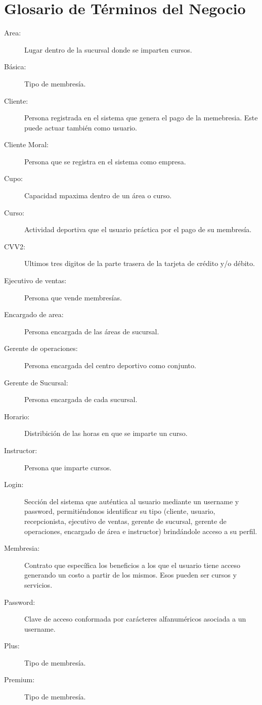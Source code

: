 \section{Glosario de Términos del Negocio}

\begin{description}
	\item[Area:] Lugar dentro de la sucursal donde se imparten cursos.
	\item[Básica:] Tipo de membresía.
	\item[Cliente:] Persona registrada en el sistema que genera el pago de la memebresia. Este puede actuar también como usuario.
	\item[Cliente Moral:] Persona que se registra en el sistema como empresa.
	\item[Cupo: ] Capacidad mpaxima dentro de un área o curso.
	\item[Curso:] Actividad deportiva que el usuario práctica por el pago de su membresía.
	\item[CVV2:] Ultimos tres digitos de la parte trasera de la tarjeta de crédito y/o débito.
	\item[Ejecutivo de ventas:] Persona que vende membresías.
	\item[Encargado de area:] Persona encargada de las áreas de sucursal.
	\item[Gerente de operaciones:] Persona encargada del centro deportivo como conjunto.
	\item[Gerente de Sucursal:] Persona encargada de cada sucursal.
	\item[Horario:] Distribición de las horas en que se imparte un curso.
	\item[Instructor:] Persona que imparte cursos.
	\item[Login:] Sección del sistema que auténtica al usuario mediante un username y password, permitiéndonos identificar su tipo (cliente, usuario, recepcionista, ejecutivo de ventas, gerente de sucursal, gerente de operaciones, encargado de área e instructor) brindándole acceso a su perfil.
	\item[Membresia:] Contrato que específica los beneficios a los que el usuario tiene acceso generando un costo a partir de los mismos. Esos pueden ser cursos y servicios.
	\item[Password:] Clave de acceso conformada por carácteres alfanuméricos asociada a un username.
	\item[Plus:] Tipo de membresía.
	\item[Premium:] Tipo de membresía.

\end{description}
